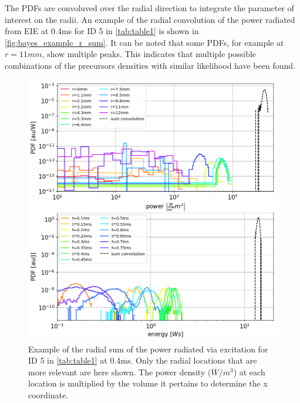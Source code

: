 The PDFs are convoluved over the radial direction to integrate the parameter of interest on the radii. An example of the radial convolution of the power radiated from EIE at 0.4ms for ID 5 in \autoref{tab:table1} is shown in \autoref{fig:bayes_example_r_sum}. It can be noted that some PDFs, for example at $r=11mm$, show multiple peaks. This indicates that multiple possible combinations of the precursors densities with similar likelihood have been found.
\begin{figure}[!ht]
	\centering
	\includegraphics[width=0.9\linewidth,trim={0 332 0 0},clip]{Chapters/chapter3/figs/Bayesian_example_1.png}
	\caption{Example of the radial sum of the power radiated via excitation for ID 5 in \autoref{tab:table1} at 0.4ms. Only the radial locations that are more relevant are here shown. The power density ($W/m^3$) at each location is multiplied by the volume it pertains to determine the x coordinate.}
	\label{fig:bayes_example_r_sum}
\end{figure}

